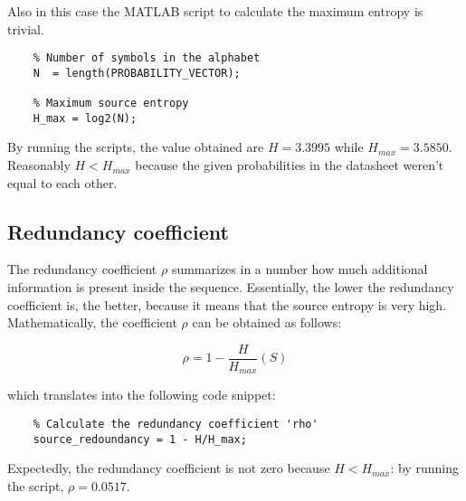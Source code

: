 \noindent Also in this case the MATLAB script to calculate the maximum entropy is trivial.

\begin{lstlisting}
    % Number of symbols in the alphabet
    N  = length(PROBABILITY_VECTOR);

    % Maximum source entropy
    H_max = log2(N);
\end{lstlisting}

\noindent By running the scripts, the value obtained are $H = 3.3995$ while $H_{max} = 3.5850$. Reasonably $H < H_{max}$ because the given probabilities in the datasheet weren't equal to each other.

% 
\subsection{Redundancy coefficient}

The redundancy coefficient $\rho$ summarizes in a number how much additional information is present inside the sequence. Essentially, the lower the redundancy coefficient is, the better, because it means that the source entropy is very high. Mathematically, the coefficient $\rho$ can be obtained as follows:

\begin{equation*}
    \rho = 1 - \frac{H}{H_{max}}(S)    
\end{equation*}

\noindent which translates into the following code snippet:

\begin{lstlisting}
    % Calculate the redundancy coefficient 'rho'
    source_redoundancy = 1 - H/H_max;
\end{lstlisting}

\noindent Expectedly, the redundancy coefficient is not zero because $H<H_{max}$: by running the script, $\rho = 0.0517$.



